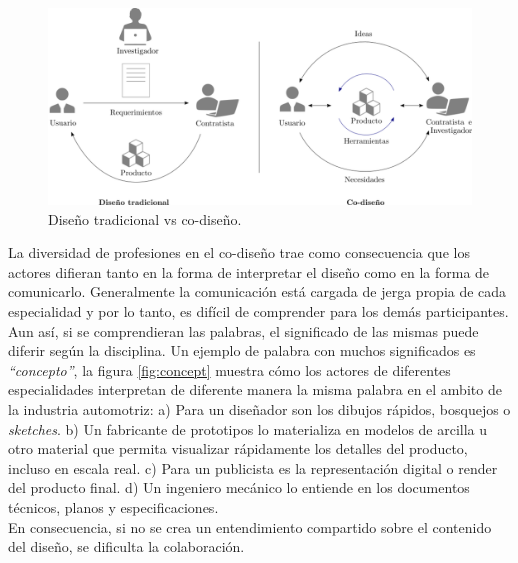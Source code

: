\begin{figure}[h]
\centering
\includegraphics[width=16cm]{Img/INTRO/intro-codesign0.png}
\caption{\footnotesize{Diseño tradicional vs co-diseño.}}
\label{fig:codesign}
\end{figure}


La diversidad de profesiones en el co-diseño trae como consecuencia que los actores difieran tanto en la forma de interpretar el diseño como en la forma de comunicarlo. Generalmente la comunicación está cargada de jerga propia de cada especialidad y por lo tanto, es difícil de comprender para los demás participantes. Aun así, si se comprendieran las palabras, el significado de las mismas puede diferir según la disciplina. Un ejemplo de palabra con muchos significados es \textit{``concepto''}, la figura \ref{fig:concept} muestra cómo los actores de diferentes especialidades interpretan de diferente manera la misma palabra en el ambito de la industria automotriz: 
a) Para un diseñador son los dibujos rápidos, bosquejos o \textit{sketches}. b) Un fabricante de prototipos lo materializa en modelos de arcilla u otro material que permita visualizar rápidamente los detalles del producto, incluso en escala real. c) Para un publicista es la representación digital o render del producto final. d) Un ingeniero mecánico lo entiende en los documentos técnicos, planos y especificaciones. \citep{Kleinsmann2006} \\

En consecuencia, si no se crea un entendimiento compartido sobre el contenido del diseño, se dificulta la colaboración. 

